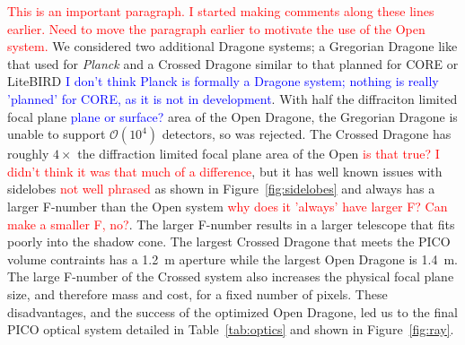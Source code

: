 \documentclass[]{spie}  %
\newcommand{\comr}[1]{\textcolor{red}{#1}}
\newcommand{\comb}[1]{\textcolor{blue}{#1}}
\begin{document}

\comr{This is an important paragraph. I started making comments along these lines earlier. Need to move the paragraph 
earlier to motivate the use of the Open system.}
We considered two additional Dragone systems; a Gregorian Dragone like that used for \textit{Planck} and a Crossed Dragone 
similar to that planned for CORE or LiteBIRD \comb{I don't think Planck is formally a Dragone system; nothing is 
really 'planned' for CORE, as it is not in development}.  With half the diffraciton limited focal plane \comb{plane or surface?} 
area of the Open Dragone,\cite{core2018_inst}  the Gregorian Dragone is 
unable to support $\mathcal{O}(10^4)$ detectors, so was rejected.  
The Crossed Dragone has roughly $4\times$ the diffraction limited focal plane area of the Open \comr{is that true? I didn't 
think it was that much of a difference}, but it has well 
known issues with sidelobes \comr{not well phrased} as shown in Figure~\ref{fig:sidelobes} and always has a larger F-number 
than the Open system \comr{why does it 'always' have larger F? Can make a smaller F, no?}.  
The larger F-number results in a larger telescope that fits poorly into the shadow cone. The largest Crossed Dragone 
that meets the PICO volume contraints has 
a 1.2~m aperture while the largest Open Dragone is 1.4~m. The large F-number of the Crossed system also increases 
the physical focal plane size, and therefore mass and cost, for a fixed number of pixels.  
These disadvantages, and the success of the optimized 
Open Dragone, led us to the final PICO optical system detailed in Table~\ref{tab:optics} and shown in Figure~\ref{fig:ray}.
\end{document}
